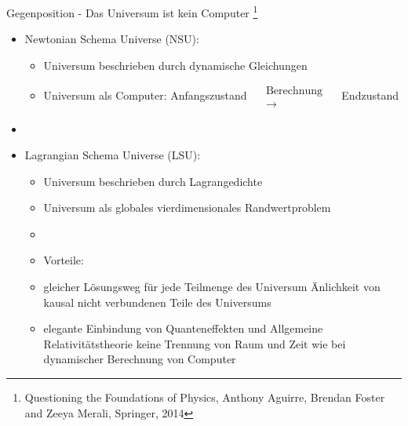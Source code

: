 \documentclass[aspectratio=1610, 9pt]{beamer}
\begin{document}
\begin{frame}{Gegenposition - Das Universum ist kein Computer \footnote[17]{Questioning the Foundations of Physics, Anthony Aguirre, Brendan Foster and Zeeya Merali, Springer, 2014}}
  \begin{itemize}
    \item Newtonian Schema Universe (NSU):
    \begin{itemize}
      \item Universum beschrieben durch dynamische Gleichungen
      \item Universum als Computer: Anfangszustand $\quad \begin{matrix*}\text{Berechnung}\\ \longrightarrow\end{matrix*} \quad $ Endzustand
    \end{itemize}
    \item[]
    \item Lagrangian Schema Universe (LSU):
    \begin{itemize}
      \item Universum beschrieben durch Lagrangedichte
      \item Universum als globales vierdimensionales Randwertproblem
      \item[]
      \item Vorteile:
      \item gleicher Lösungsweg für jede Teilmenge des Universum \rightarrow Änlichkeit von kausal nicht verbundenen Teile des Universums
      \item elegante Einbindung von Quanteneffekten und Allgemeine Relativitätstheorie \rightarrow keine Trennung von Raum und Zeit wie bei dynamischer Berechnung von Computer
    \end{itemize}
  \end{itemize}

\end{frame}
\end{document}

